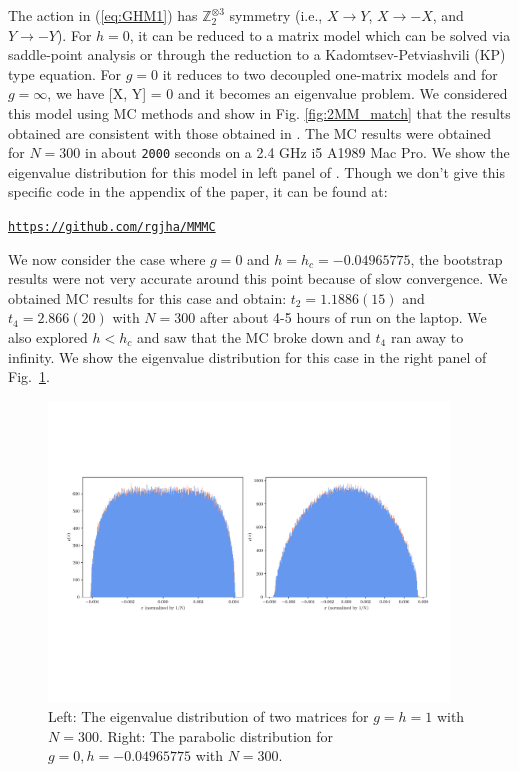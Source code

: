 \documentclass[11pt]{article}
\begin{document}
The action in (\ref{eq:GHM1}) has $\mathbb{Z}_{2}^{\otimes 3}$ symmetry 
(i.e., $X \to Y$, $X \to -X$, and $Y \to -Y$). For $h = 0$, it can be reduced to a
matrix model which can be solved via saddle-point analysis or through the reduction 
to a Kadomtsev-Petviashvili (KP) type equation. 
For $g = 0$ it reduces to two decoupled one-matrix models 
and for $g = \infty$, we have [X, Y] = 0 and it becomes an eigenvalue problem. 
We considered this model using MC methods and show in Fig. \ref{fig:2MM_match} that the results 
obtained are consistent with those obtained in \cite{Kazakov:2021lel}. The MC 
results were obtained for $N = 300$ in about \texttt{2000} seconds on a 2.4 GHz i5 A1989 Mac Pro. 
We show the eigenvalue distribution for this model in left panel of \label{fig:2MM_match1}. 
Though we don't give this specific code in the appendix of the 
paper, it can be found at: 
\begin{center} \texttt{\href{https://github.com/rgjha/MMMC}{https://github.com/rgjha/MMMC}} \end{center}
We now consider the case where $g=0$ and $h = h_{c}=-0.04965775$, the bootstrap results were not 
very accurate around this point because of slow convergence. We obtained MC results for this case 
and obtain: $t_{2} = 1.1886(15)$ and $t_{4}=2.866(20)$ with $N=300$ after about 4-5 hours of run on the
laptop. We also explored $h < h_{c}$ and saw that the MC broke down and $t_{4}$ ran away to infinity. 
We show the eigenvalue distribution for this case in the right panel of Fig.~\ref{fig:2MM_match1}. 
\begin{figure}[htbp] 
	\centering 
	\includegraphics[width=0.95\textwidth]{figs/plot_2MM_evd_both.pdf}
	\caption{\label{fig:2MM_match1}Left: The eigenvalue distribution of two matrices for $g=h=1$ with $N=300$.
	Right: The parabolic distribution for $g = 0, h = -0.04965775$ with $N=300$.}
\end{figure}
\end{document}
